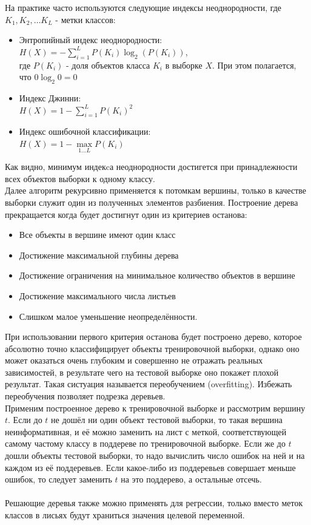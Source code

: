 \documentclass{article}
\begin{document}
         На практике часто используются следующие индексы неоднородности, где $K_1, K_2, \dots K_L$ - метки классов:
        \begin{itemize}
            \item Энтропийный индекс неоднородности: \\
                $H(X) = - \sum\limits_{i = 1}^L P(K_i) \log_2(P(K_i))$, \\
                где $P(K_i)$ - доля объектов класса $K_i$  в выборке $X$. При этом полагается, что $0\log_2 0 = 0$
            \item Индекс Джинни: \\
                $H(X) = 1  - \sum\limits_{i = 1}^L P(K_i)^2$
            \item Индекс ошибочной классификации: \\
                $H(X) = 1  - \max\limits_{1 \dots L} P(K_i)$
        \end{itemize}
        Как видно, минимум индекcа неоднородности достигется при принадлежности всех объектов выборки к одному классу. \\
        Далее алгоритм рекурсивно применяется к потомкам вершины, только в качестве выборки служит один из полученных элементов разбиения. Построение дерева прекращается когда будет достигнут один из критериев останова:
        \begin{itemize}
            \item Все объекты в вершине имеют один класс
            \item Достижение максимальной глубины дерева
            \item Достижение ограничения на минимальное количество объектов в вершине 
            \item Достижение максимального числа листьев
            \item Слишком малое уменьшение неопределённости.
        \end{itemize}
        При использовании первого критерия останова будет построено дерево, которое абсолютно точно классифицирует объекты тренировочной выборки, однако оно может оказаться очень глубоким и совершенно не отражать реальных зависимостей, в результате чего на тестовой выборке оно покажет плохой результат. Такая систуация называется переобучением (overfitting). Избежать переобучения позволяет подрезка деревьев. \\
        Применим построенное дерево к тренировочной выборке и рассмотрим вершину $t$. Если до $t$ не дошёл ни один объект тестовой выборки, то такая вершина неинформативная, и её можно заменить на лист с меткой, соответствующей самому частому классу в поддереве по тренировочной выборке. Если же до $t$ дошли объекты тестовой выборки, то надо вычислить число ошибок на ней и на каждом из её поддеревьев. Если какое-либо из поддеревьев совершает меньше ошибок, то следует заменить $t$ на это поддерево, а остальные отсечь.
        \\\\
        Решающие деревья также можно применять для регрессии, только вместо меток классов в лисьях будут храниться значения целевой переменной.
        
\end{document}
